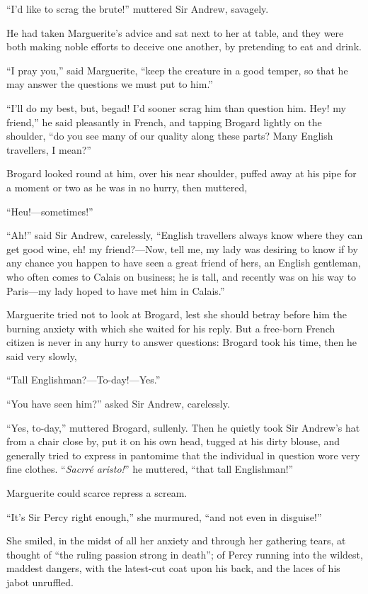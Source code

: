 \enquote{I'd like to scrag the brute!} muttered Sir Andrew, savagely.

He had taken Marguerite's advice and sat next to her at table, and they were both making noble efforts to deceive one another, by pretending to eat and drink.

\enquote{I pray you,} said Marguerite, \enquote{keep the creature in a good temper, so that he may answer the questions we must put to him.}

\enquote{I'll do my best, but, begad! I'd sooner scrag him than question him. Hey! my friend,} he said pleasantly in French, and tapping Brogard lightly on the shoulder, \enquote{do you see many of our quality along these parts? Many English travellers, I mean?}

Brogard looked round at him, over his near shoulder, puffed away at his pipe for a moment or two as he was in no hurry, then muttered,\longdash


\enquote{Heu!---sometimes!}

\enquote{Ah!} said Sir Andrew, carelessly, \enquote{English travellers always know where they can get good wine, eh! my friend?---Now, tell me, my lady was desiring to know if by any chance you happen to have seen a great friend of hers, an English gentleman, who often comes to Calais on business; he is tall, and recently was on his way to Paris---my lady hoped to have met him in Calais.}

Marguerite tried not to look at Brogard, lest she should betray before him the burning anxiety with which she waited for his reply. But a free-born French citizen is never in any hurry to answer questions: Brogard took his time, then he said very slowly,\longdash


\enquote{Tall Englishman?---To-day!---Yes.}

\enquote{You have seen him?} asked Sir Andrew, carelessly.

\enquote{Yes, to-day,} muttered Brogard, sullenly. Then he quietly took Sir Andrew's hat from a chair close by, put it on his own head, tugged at his dirty blouse, and generally tried to express in pantomime that the individual in question wore very fine clothes. \enquote{\textit{Sacrré aristo!}} he muttered, \enquote{that tall Englishman!}

Marguerite could scarce repress a scream.

\enquote{It's Sir Percy right enough,} she murmured, \enquote{and not even in disguise!}

She smiled, in the midst of all her anxiety and through her gathering tears, at thought of \enquote{the ruling passion strong in death}; of Percy running into the wildest, maddest dangers, with the latest-cut coat upon his back, and the laces of his jabot unruffled.

